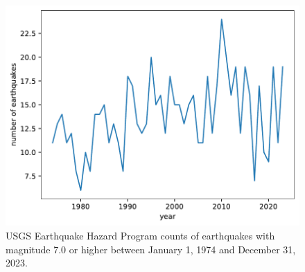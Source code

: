 \subsection{}
\begin{figure}[H]
    \centering
    \includegraphics[width=0.5\linewidth]{data/05_reporting/problem_set_3/quake_counts.pdf}
    \caption{USGS Earthquake Hazard Program counts of earthquakes with magnitude 7.0 or higher between January 1, 1974 and December 31, 2023.}
    \label{fig:quake-counts}
\end{figure}